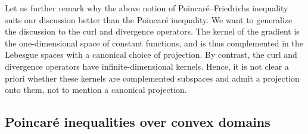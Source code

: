 \documentclass[a4paper]{article}
\begin{document}
\begin{remark}
    Let us further remark why the above notion of Poincar\'e--Friedrichs inequality suits our discussion better than the Poincar\'e inequality. 
    We want to generalize the discussion to the curl and divergence operators. 
    The kernel of the gradient is the one-dimensional space of constant functions, and is thus complemented in the Lebesgue spaces with a canonical choice of projection. 
    By contrast, the curl and divergence operators have infinite-dimensional kernels. 
    Hence, it is not clear a priori whether these kernels are complemented subspaces and admit a projection onto them, not to mention a canonical projection. 
\end{remark}




\subsection{Poincar\'e inequalities over convex domains}
\end{document}
